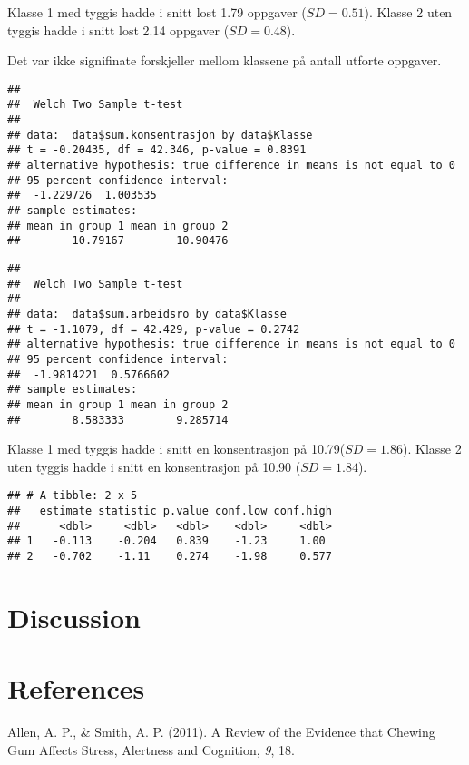\documentclass[
  english,
  man]{apa6}
\begin{document}
Klasse 1 med tyggis hadde i snitt lost 1.79 oppgaver (\(SD = 0.51\)). Klasse 2 uten tyggis hadde i snitt lost 2.14 oppgaver (\(SD = 0.48\)).

Det var ikke signifinate forskjeller mellom klassene på antall utforte oppgaver.

\begin{verbatim}
## 
##  Welch Two Sample t-test
## 
## data:  data$sum.konsentrasjon by data$Klasse
## t = -0.20435, df = 42.346, p-value = 0.8391
## alternative hypothesis: true difference in means is not equal to 0
## 95 percent confidence interval:
##  -1.229726  1.003535
## sample estimates:
## mean in group 1 mean in group 2 
##        10.79167        10.90476
\end{verbatim}

\begin{verbatim}
## 
##  Welch Two Sample t-test
## 
## data:  data$sum.arbeidsro by data$Klasse
## t = -1.1079, df = 42.429, p-value = 0.2742
## alternative hypothesis: true difference in means is not equal to 0
## 95 percent confidence interval:
##  -1.9814221  0.5766602
## sample estimates:
## mean in group 1 mean in group 2 
##        8.583333        9.285714
\end{verbatim}

Klasse 1 med tyggis hadde i snitt en konsentrasjon på 10.79(\(SD = 1.86\)). Klasse 2 uten tyggis hadde i snitt en konsentrasjon på 10.90 (\(SD = 1.84\)).

\begin{verbatim}
## # A tibble: 2 x 5
##   estimate statistic p.value conf.low conf.high
##      <dbl>     <dbl>   <dbl>    <dbl>     <dbl>
## 1   -0.113    -0.204   0.839    -1.23     1.00 
## 2   -0.702    -1.11    0.274    -1.98     0.577
\end{verbatim}

\hypertarget{discussion}{%
\section{Discussion}\label{discussion}}

\newpage

\hypertarget{references}{%
\section{References}\label{references}}

\begingroup
\setlength{\parindent}{-0.5in}
\setlength{\leftskip}{0.5in}

\hypertarget{refs}{}
\leavevmode\hypertarget{ref-allenReviewEvidenceThat2011}{}%
Allen, A. P., \& Smith, A. P. (2011). A Review of the Evidence that Chewing Gum Affects Stress, Alertness and Cognition, \emph{9}, 18.
\end{document}
